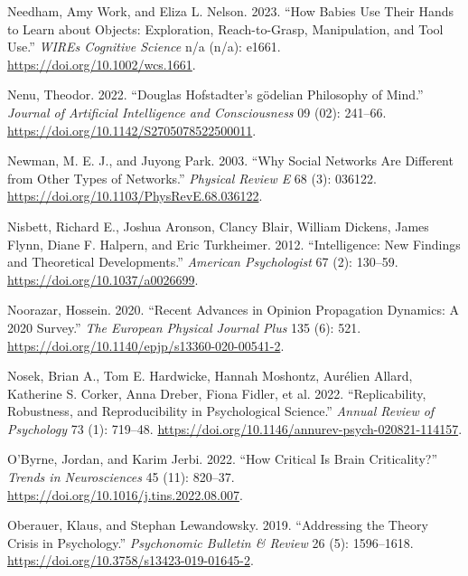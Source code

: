 \documentclass[
  a4paper,
  DIV=11,
  numbers=noendperiod,
  oneside]{scrreprt}
\newlength{\cslhangindent}
\newenvironment{CSLReferences}[2] %
 {\begin{list}{}{%
  \setlength{\itemindent}{0pt}
  \setlength{\leftmargin}{0pt}
  \setlength{\parsep}{0pt}
  \ifodd #1
   \setlength{\leftmargin}{\cslhangindent}
   \setlength{\itemindent}{-1\cslhangindent}
  \fi
  \setlength{\itemsep}{#2\baselineskip}}}
 {\end{list}}
\begin{document}
\begin{CSLReferences}{1}{0}
Needham, Amy Work, and Eliza L. Nelson. 2023. {``How Babies Use Their
Hands to Learn about Objects: {Exploration}, Reach-to-Grasp,
Manipulation, and Tool Use.''} \emph{WIREs Cognitive Science} n/a (n/a):
e1661. \url{https://doi.org/10.1002/wcs.1661}.

Nenu, Theodor. 2022. {``Douglas Hofstadter{'}s g{ö}delian Philosophy of
Mind.''} \emph{Journal of Artificial Intelligence and Consciousness} 09
(02): 241--66. \url{https://doi.org/10.1142/S2705078522500011}.

Newman, M. E. J., and Juyong Park. 2003. {``Why Social Networks Are
Different from Other Types of Networks.''} \emph{Physical Review E} 68
(3): 036122. \url{https://doi.org/10.1103/PhysRevE.68.036122}.

Nisbett, Richard E., Joshua Aronson, Clancy Blair, William Dickens,
James Flynn, Diane F. Halpern, and Eric Turkheimer. 2012.
{``Intelligence: New Findings and Theoretical Developments.''}
\emph{American Psychologist} 67 (2): 130--59.
\url{https://doi.org/10.1037/a0026699}.

Noorazar, Hossein. 2020. {``Recent Advances in Opinion Propagation
Dynamics: A 2020 Survey.''} \emph{The European Physical Journal Plus}
135 (6): 521. \url{https://doi.org/10.1140/epjp/s13360-020-00541-2}.

Nosek, Brian A., Tom E. Hardwicke, Hannah Moshontz, Aurélien Allard,
Katherine S. Corker, Anna Dreber, Fiona Fidler, et al. 2022.
{``Replicability, {Robustness}, and {Reproducibility} in {Psychological
Science}.''} \emph{Annual Review of Psychology} 73 (1): 719--48.
\url{https://doi.org/10.1146/annurev-psych-020821-114157}.

O'Byrne, Jordan, and Karim Jerbi. 2022. {``How Critical Is Brain
Criticality?''} \emph{Trends in Neurosciences} 45 (11): 820--37.
\url{https://doi.org/10.1016/j.tins.2022.08.007}.

Oberauer, Klaus, and Stephan Lewandowsky. 2019. {``Addressing the Theory
Crisis in Psychology.''} \emph{Psychonomic Bulletin \& Review} 26 (5):
1596--1618. \url{https://doi.org/10.3758/s13423-019-01645-2}.


\end{CSLReferences}
\end{document}
